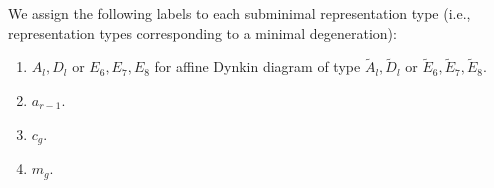 \documentclass[letterpaper,10pt,english]{sphinxmanual}
\begin{document}
\sphinxAtStartPar
We assign the following labels to each subminimal representation type (i.e., representation types corresponding to a minimal degeneration):
\begin{enumerate}
%
\item {} 
\sphinxAtStartPar
\(A_l,D_l\) or \(E_6,E_7,E_8\) for affine Dynkin diagram of type \(\tilde{A}_l,\tilde{D}_l\) or \(\tilde{E}_6,\tilde{E}_7,\tilde{E}_8\).

\item {} 
\sphinxAtStartPar
\(a_{r-1}\).

\item {} 
\sphinxAtStartPar
\(c_g\).

\item {} 
\sphinxAtStartPar
\(m_g\).

\end{enumerate}
\end{document}
